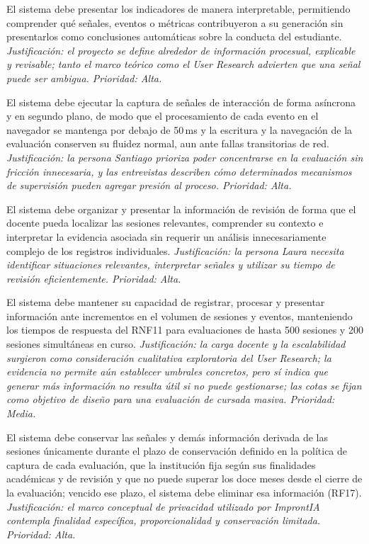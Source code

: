 \begin{description}[leftmargin=0cm, style=nextline]
\item[\textbf{RNF06 --- Explicabilidad de indicadores}] El sistema debe presentar los indicadores de manera interpretable, permitiendo comprender qué señales, eventos o métricas contribuyeron a su generación sin presentarlos como conclusiones automáticas sobre la conducta del estudiante. \textit{Justificación: el proyecto se define alrededor de información procesual, explicable y revisable; tanto el marco teórico como el User Research advierten que una señal puede ser ambigua. Prioridad: Alta.}
\item[\textbf{RNF07 --- Baja interferencia de la captura}] El sistema debe ejecutar la captura de señales de interacción de forma asíncrona y en segundo plano, de modo que el procesamiento de cada evento en el navegador se mantenga por debajo de 50\,ms y la escritura y la navegación de la evaluación conserven su fluidez normal, aun ante fallas transitorias de red. \textit{Justificación: la persona Santiago prioriza poder concentrarse en la evaluación sin fricción innecesaria, y las entrevistas describen cómo determinados mecanismos de supervisión pueden agregar presión al proceso. Prioridad: Alta.}
\item[\textbf{RNF08 --- Usabilidad para la revisión docente}] El sistema debe organizar y presentar la información de revisión de forma que el docente pueda localizar las sesiones relevantes, comprender su contexto e interpretar la evidencia asociada sin requerir un análisis innecesariamente complejo de los registros individuales. \textit{Justificación: la persona Laura necesita identificar situaciones relevantes, interpretar señales y utilizar su tiempo de revisión eficientemente. Prioridad: Alta.}
\item[\textbf{RNF09 --- Escalabilidad}] El sistema debe mantener su capacidad de registrar, procesar y presentar información ante incrementos en el volumen de sesiones y eventos, manteniendo los tiempos de respuesta del RNF11 para evaluaciones de hasta 500 sesiones y 200 sesiones simultáneas en curso. \textit{Justificación: la carga docente y la escalabilidad surgieron como consideración cualitativa exploratoria del User Research; la evidencia no permite aún establecer umbrales concretos, pero sí indica que generar más información no resulta útil si no puede gestionarse; las cotas se fijan como objetivo de diseño para una evaluación de cursada masiva. Prioridad: Media.}
\item[\textbf{RNF10 --- Conservación limitada de datos}] El sistema debe conservar las señales y demás información derivada de las sesiones únicamente durante el plazo de conservación definido en la política de captura de cada evaluación, que la institución fija según sus finalidades académicas y de revisión y que no puede superar los doce meses desde el cierre de la evaluación; vencido ese plazo, el sistema debe eliminar esa información (RF17). \textit{Justificación: el marco conceptual de privacidad utilizado por ImprontIA contempla finalidad específica, proporcionalidad y conservación limitada. Prioridad: Alta.}

\end{description}
